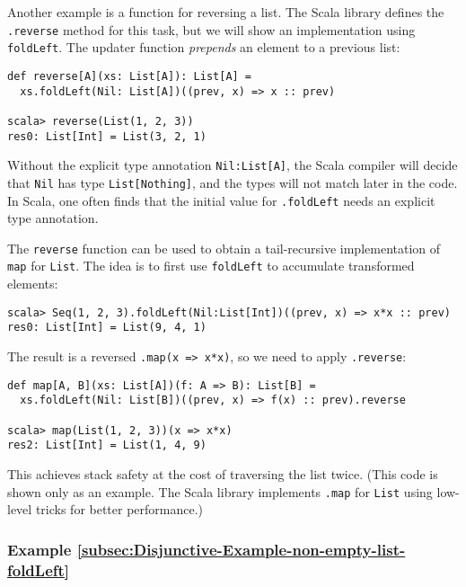 Another example is a function for reversing a list. The Scala library
defines the \lstinline!.reverse! method for this task, but we will
show an implementation using \lstinline!foldLeft!. The updater function
\emph{prepends} an element to a previous list:
\begin{lstlisting}
def reverse[A](xs: List[A]): List[A] =
  xs.foldLeft(Nil: List[A])((prev, x) => x :: prev)

scala> reverse(List(1, 2, 3))
res0: List[Int] = List(3, 2, 1) 
\end{lstlisting}
Without the explicit type annotation \lstinline!Nil:List[A]!, the
Scala compiler will decide that \lstinline!Nil! has type \lstinline!List[Nothing]!,
and the types will not match later in the code. In Scala, one often
finds that the initial value for \lstinline!.foldLeft! needs an explicit
type annotation.

The \lstinline!reverse! function can be used to obtain a tail-recursive
implementation of \lstinline!map! for \lstinline!List!. The idea
is to first use \lstinline!foldLeft! to accumulate transformed elements:
\begin{lstlisting}
scala> Seq(1, 2, 3).foldLeft(Nil:List[Int])((prev, x) => x*x :: prev)
res0: List[Int] = List(9, 4, 1)
\end{lstlisting}
The result is a reversed \lstinline!.map(x => x*x)!, so we need to
apply \lstinline!.reverse!:
\begin{lstlisting}
def map[A, B](xs: List[A])(f: A => B): List[B] =
  xs.foldLeft(Nil: List[B])((prev, x) => f(x) :: prev).reverse

scala> map(List(1, 2, 3))(x => x*x)
res2: List[Int] = List(1, 4, 9)
\end{lstlisting}
This achieves stack safety at the cost of traversing the list twice.
(This code is shown only as an example. The Scala library implements
\lstinline!.map! for \lstinline!List! using low-level tricks for
better performance.)

\subsubsection{Example \label{subsec:Disjunctive-Example-non-empty-list-foldLeft}\ref{subsec:Disjunctive-Example-non-empty-list-foldLeft}}

